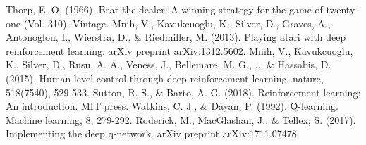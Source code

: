\documentclass[conference]{IEEEtran}
\begin{document}


\begin{thebibliography}{00}
 Thorp, E. O. (1966). Beat the dealer: A winning strategy for the game of twenty-one (Vol. 310). Vintage.
 Mnih, V., Kavukcuoglu, K., Silver, D., Graves, A., Antonoglou, I., Wierstra, D., \& Riedmiller, M. (2013). Playing atari with deep reinforcement learning. arXiv preprint arXiv:1312.5602.
 Mnih, V., Kavukcuoglu, K., Silver, D., Rusu, A. A., Veness, J., Bellemare, M. G., ... \& Hassabis, D. (2015). Human-level control through deep reinforcement learning. nature, 518(7540), 529-533.
 Sutton, R. S., \& Barto, A. G. (2018). Reinforcement learning: An introduction. MIT press.
 Watkins, C. J., \& Dayan, P. (1992). Q-learning. Machine learning, 8, 279-292.
 Roderick, M., MacGlashan, J., \& Tellex, S. (2017). Implementing the deep q-network. arXiv preprint arXiv:1711.07478.
\end{thebibliography}
\end{document}
